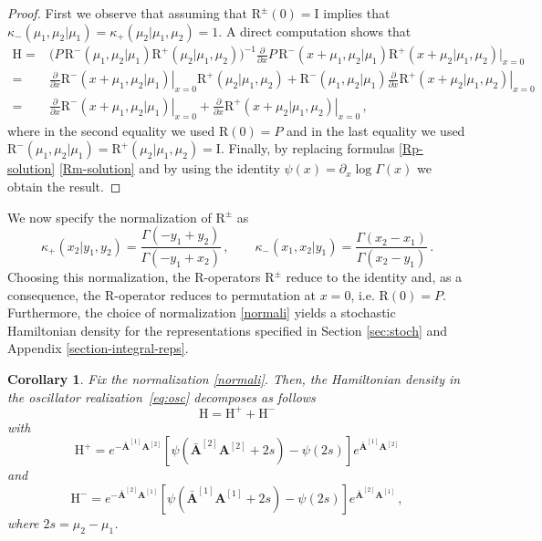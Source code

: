 \documentclass[11pt]{article}
\numberwithin{equation}{section}
\newtheorem{corollary}[theorem]{Corollary}
\newcommand{\OA}{\mathbf{A}}
\newcommand{\OAD}{\mathbf{\bar{A}}}
\newcommand{\ID}{\mathrm{I}}
\newcommand{\abrOSCR}{\mathrm{R}}
\newcommand{\abrOSCH}{\mathrm{H}}
\begin{document}
\begin{proof}
   First we observe that assuming that $\abrOSCR^{\pm}(0)=\ID$ implies that $\kappa_{-}(\mu_{1},\mu_{2}|\mu_{1})=\kappa_{+}(\mu_{2}|\mu_{1},\mu_{2})=1$. A direct computation shows that
\begin{equation}
\begin{split}
  \abrOSCH=&\bigg(P\,\abrOSCR^-(\mu_1,\mu_2|\mu_1)\abrOSCR^+(\mu_2|\mu_1,\mu_2)\bigg)^{-1}\frac{\partial}{\partial x}P\,\abrOSCR^-(x+\mu_1,\mu_2|\mu_1)\abrOSCR^+(x+\mu_2|\mu_1,\mu_2)\bigg|_{x=0}
      \\=&  \left.\frac{\partial}{\partial x}\abrOSCR^-(x+\mu_1,\mu_2|\mu_1)\right|_{x=0}\abrOSCR^+(\mu_2|\mu_1,\mu_2)
 +\left.\abrOSCR^-(\mu_1,\mu_2|\mu_1)\frac{\partial}{\partial x}\abrOSCR^+(x+\mu_2|\mu_1,\mu_2)\right|_{x=0}
 \\=& \left.\frac{\partial}{\partial x}\abrOSCR^-(x+\mu_1,\mu_2|\mu_1)\right|_{x=0}
 +\left.\frac{\partial}{\partial x}\abrOSCR^+(x+\mu_2|\mu_1,\mu_2)\right|_{x=0}\,,
 \end{split}
\end{equation}
 where in the second equality we used $\abrOSCR(0)=P$ and in the last equality we used $\abrOSCR^-(\mu_1,\mu_2|\mu_1)=\abrOSCR^+(\mu_2|\mu_1,\mu_2)=\ID$. Finally, by replacing formulas \eqref{Rp-solution} \eqref{Rm-solution} and by using the identity $\psi(x)=\partial_x\log \Gamma(x)$ we obtain the result. 
\end{proof}

 
We now specify the normalization of $\abrOSCR^{\pm}$ as
 \begin{equation}\label{normali}
		 				\kappa_+(x_2|y_1,y_2)=\frac{\Gamma(-y_1+y_2)}{\Gamma(-y_1+x_2)}\,,\qquad
		 				\kappa_-(x_1,x_2|y_1)=\frac{\Gamma(x_2-x_1)}{\Gamma(x_2-y_1)}\,.
		 			\end{equation}
Choosing this normalization, the R-operators $ \abrOSCR^\pm$ reduce to the identity and, as a consequence, the R-operator reduces to permutation at $x=0$, i.e. $ \abrOSCR(0)=P$.
Furthermore, the choice of normalization \eqref{normali} yields a stochastic Hamiltonian density for the representations specified in Section \ref{sec:stoch} and Appendix \ref{section-integral-reps}.
\begin{corollary}\label{Hamalg}
 Fix the normalization \eqref{normali}. Then, the Hamiltonian density in the oscillator realization~\eqref{eq:osc} decomposes as follows 
 \begin{equation}\label{bulk-density-Hamiltonian}
  \abrOSCH=\abrOSCH^++\abrOSCH^-
 \end{equation}
with
			\begin{equation}\label{Rp-solutionD}
					\abrOSCH^+ = e^{-\OAD^{[1]}\OA^{[2]}}\left[\psi(\OAD^{[2]}\OA^{[2]}+2s)-
                    \psi(2s)
                    \right]e^{\OAD^{[1]}\OA^{[2]}}
		\end{equation}
        and
\begin{equation}\label{Rm-solutionD}
			\abrOSCH^-=e^{-\OAD^{[2]}\OA^{[1]}}\left[\psi(\OAD^{[1]}\OA^{[1]}+2s)-
            \psi(2s)
            \right]e^{\OAD^{[2]}\OA^{[1]}}\,,
		\end{equation}
where $2s=\mu_2-\mu_1$.

\end{corollary}
\end{document}
